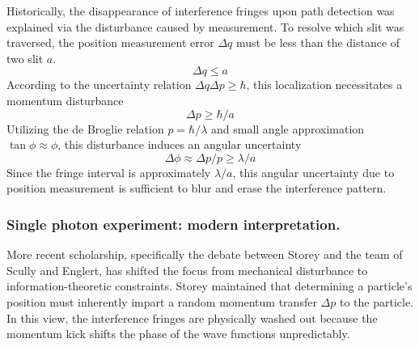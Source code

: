 \documentclass[../../../main.tex]{subfiles}
\begin{document}
Historically, the disappearance of interference fringes upon path detection was explained via the disturbance caused by measurement.
To resolve which slit was traversed, the position measurement error $\Delta q$ must be less than the distance of two slit $a$.
\begin{equation*}
  \Delta q \leq a
\end{equation*}
According to the uncertainty relation $\Delta q \Delta p \geq \hbar $, this localization necessitates a momentum disturbance
\begin{equation*}
  \Delta p \geq \hbar /a
\end{equation*}
Utilizing the de Broglie relation $p=\hbar /\lambda$ and small angle approximation $\tan \phi \approx \phi$, this disturbance induces an angular uncertainty
\begin{equation*}
  \Delta \phi \approx \Delta p/p \geq \lambda/a
\end{equation*}
Since the fringe interval is approximately $\lambda/a$, this angular uncertainty due to position measurement is sufficient to blur and erase the interference pattern.

\subsubsection{Single photon experiment: modern interpretation.}
More recent scholarship, specifically the debate between Storey and the team of Scully and Englert, has shifted the focus from mechanical disturbance to information-theoretic constraints.
Storey maintained that determining a particle's position must inherently impart a random momentum transfer $\Delta p$ to the particle.
In this view, the interference fringes are physically washed out because the momentum kick shifts the phase of the wave functions unpredictably.
\end{document}
